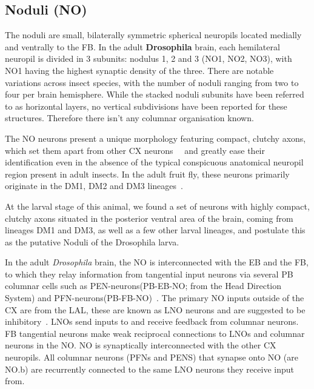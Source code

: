 \documentclass{article}
\begin{document}


\subsection{Noduli (NO)}


The noduli are small, bilaterally symmetric spherical neuropils located medially and ventrally to the FB. In the adult \textbf{Drosophila} brain, each hemilateral neuropil is divided in 3 subunits: nodulus 1, 2 and 3 (NO1, NO2, NO3), with NO1 having the highest synaptic density of the three. There are notable variations across insect species, with the number of noduli ranging from two to four per brain hemisphere.
While the stacked noduli subunits have been referred to as horizontal layers, no vertical subdivisions have been reported for these structures. Therefore there isn't any columnar organisation known.


The NO neurons present a unique morphology featuring compact, clutchy axons, which set them apart from other CX neurons~\citep{wolff2018neuroarchitecture}~\citep{hulse2021connectome} and greatly ease their identification even in the absence of the typical conspicuous anatomical neuropil region present in adult insects. In the adult fruit fly, these neurons primarily originate in the DM1, DM2 and DM3 lineages~\citep{andrade2019developmentally}.


At the larval stage of this animal, we found a set of neurons with highly compact, clutchy axons situated in the posterior ventral area of the brain, coming from lineages DM1 and DM3, as well as a few other larval lineages, and postulate this as the putative Noduli of the Drosophila larva. 

In the adult \textit{Drosophila} brain, the NO is  interconnected with the EB and the FB, to which they relay information from tangential input neurons via several PB columnar cells such as PEN-neurons(PB-EB-NO; from the Head Direction System) and PFN-neurons(PB-FB-NO)~\citep{wolff2015neuroarchitecture, hulse2021connectome}. The primary NO inputs outside of the CX are from the LAL, these are known as LNO neurons and are suggested to be inhibitory~\citep{wolff2018neuroarchitecture,hulse2021connectome}. LNOs send inputs to and receive feedback from columnar neurons. %
FB tangential neurons make weak reciprocal connections to LNOs and columnar neurons in the NO.
NO is synaptically interconnected with the other CX neuropils. All columnar neurons (PFNs and PENS) that synapse onto NO (are NO.b) are recurrently connected to the same LNO neurons they receive input from. 
\end{document}
